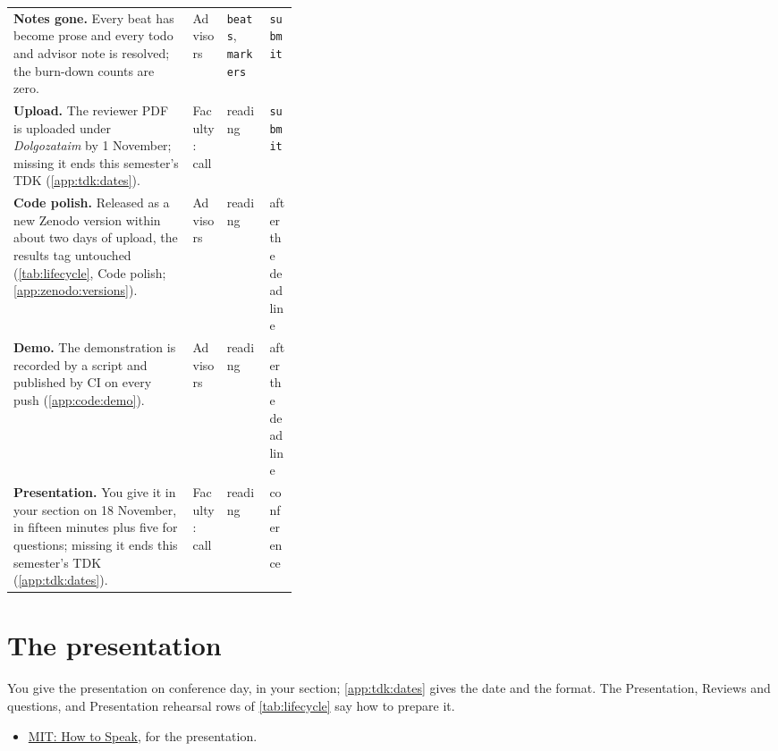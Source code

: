 {\begin{xltabular}{\linewidth}{X >{\raggedright\arraybackslash}p{0.12\linewidth} >{\raggedright\arraybackslash}p{0.15\linewidth} >{\raggedright\arraybackslash}p{0.1\linewidth}}
  \textbf{Notes gone.} Every beat has become prose and every todo and advisor note is resolved; the burn-down counts are zero. & Advisors & \texttt{beats}, \texttt{markers} & \texttt{submit} \\
  \textbf{Upload.} The reviewer PDF is uploaded under \emph{Dolgozataim} by 1 November; missing it ends this semester's TDK (\cref{app:tdk:dates}). & Faculty: call & reading & \texttt{submit} \\
  \textbf{Code polish.} Released as a new Zenodo version within about two days of upload, the results tag untouched (\cref{tab:lifecycle}, Code polish; \cref{app:zenodo:versions}). & Advisors & reading & after the deadline \\
  \textbf{Demo.} The demonstration is recorded by a script and published by CI on every push (\cref{app:code:demo}). & Advisors & reading & after the deadline \\
  \textbf{Presentation.} You give it in your section on 18 November, in fifteen minutes plus five for questions; missing it ends this semester's TDK (\cref{app:tdk:dates}). & Faculty: call & reading & conference \\
\end{xltabular}
}

\section{The presentation}\label{app:lifecycle:presentation}
You give the presentation on conference day, in your section; \cref{app:tdk:dates} gives the date and the format. The Presentation, Reviews and questions, and Presentation rehearsal rows of \cref{tab:lifecycle} say how to prepare it.
\begin{itemize}
  \item \href{https://www.youtube.com/watch?v=Unzc731iCUY}{MIT: How to Speak}, for the presentation.
\end{itemize}
